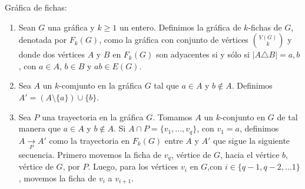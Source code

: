 \begin{definicion} Gr\'afica de fichas:
    \label{def:fichas}
    \begin{enumerate}
        \item Sean $G$ una gr\'afica y $k \geq 1$ un entero. Definimos la
        gr\'afica de $k$-fichas de $G$, denotada por $F_k(G)$, como la
        gr\'afica con conjunto de v\'ertices $\binom{V(G)}{k}$ y donde dos
        v\'ertices $A$ y $B$ en $F_k(G)$ son adyacentes si y s\'olo si $|A
        \triangle B| ={a,b}$, con $a \in A$, $b \in B$ y $ab \in E(G)$.
        \item Sea $A$ un $k$-comjunto en la gr\'afica $G$ tal que $a \in A$
        y $b\notin A$. Definimos $A'= (A \setminus \{a\}) \cup \{b\}$.
        \item Sea $P$ una trayectoria en la gr\'afica $G$. Tomamos $A$ un
        $k$-conjunto en $G$ de tal manera que $a\in A$ y $b \notin A$. Si
        $A\cap P =\{v_1, \dots, v_q\}$, con $v_1 = a$, definimos $A
        \xrightarrow[P]{} A'$ como la trayectoria en $F_k(G)$ entre $A$ y
        $A'$ que sigue la siguiente secuencia. Primero movemos la ficha de
        $v_q$, v\'ertice de $G$, hacia el v\'ertice $b$, v\'ertice de $G$,
        por $P$. Luego, para los v\'ertices $v_i$ en $G$,con $i \in \{q-1,
        q-2, \dots 1\}$, movemos la ficha de $v_i$ a $v_{i+1}$. 
    \end{enumerate}
\end{definicion}

